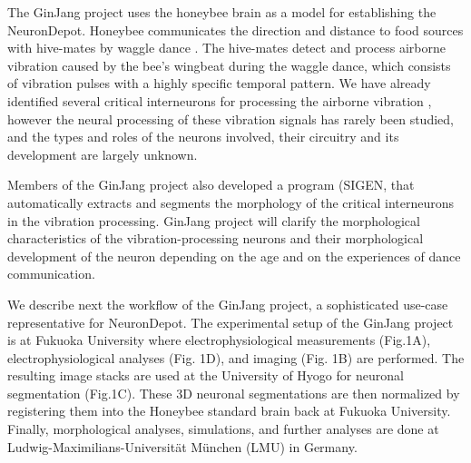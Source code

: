 \documentclass{frontiersSCNS} %
\begin{document}
The GinJang project uses the honeybee brain as a model for establishing the
NeuronDepot. Honeybee communicates the direction and distance to food sources
with hive-mates by waggle dance \citep{Frisch1967}. The hive-mates detect and
process airborne vibration caused by the bee's wingbeat during the waggle
dance, which consists of vibration pulses with a highly specific temporal
pattern. We have already identified several critical interneurons for
processing the airborne vibration \citep{Ai2007, Ai2009, Ai2010, Ai2012,
Ai2013}, however the neural processing of these
vibration signals has rarely been studied, and the types and roles of the
neurons involved, their circuitry and its development are largely unknown. 

Members of the GinJang project also developed a program (SIGEN,
\citep{Minemoto2009} that automatically extracts and segments the morphology of the
critical interneurons in the vibration processing. GinJang project will clarify
the morphological characteristics of the vibration-processing neurons and their
morphological development of the neuron depending on the age and on the
experiences of dance communication.  

We describe next the workflow of the GinJang project, a sophisticated use-case
representative for NeuronDepot. The experimental setup of the GinJang project
is at Fukuoka University where electrophysiological measurements (Fig.1A),
electrophysiological analyses (Fig. 1D), and imaging (Fig. 1B) are performed.
The resulting image stacks are used at the University of Hyogo for neuronal
segmentation (Fig.1C). These 3D neuronal segmentations are then normalized by
registering them into the Honeybee standard brain back at Fukuoka University.
Finally, morphological analyses, simulations, and further analyses  are done at
Ludwig-Maximilians-Universität München (LMU) in Germany.
\end{document}
